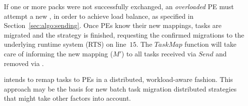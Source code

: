 If one or more packs were not successfully exchanged, an \textit{overloaded} PE must attempt a new \batchsend, in order to achieve load balance, as specified in Section~\ref{sec:algo:sending}.
Once PEs know their new mappings, tasks are migrated and the strategy is finished, requesting the confirmed migrations to the underlying runtime system (RTS) on line~$15$. 
The $TaskMap$ function will take care of informing the new mapping ($M'$) to all tasks received via $Send$ and removed via \batchsend.

\packdrop intends to remap tasks to PEs in a distributed, workload-aware fashion.
This approach may be the basis for new batch task migration distributed strategies that might take other factors into account.